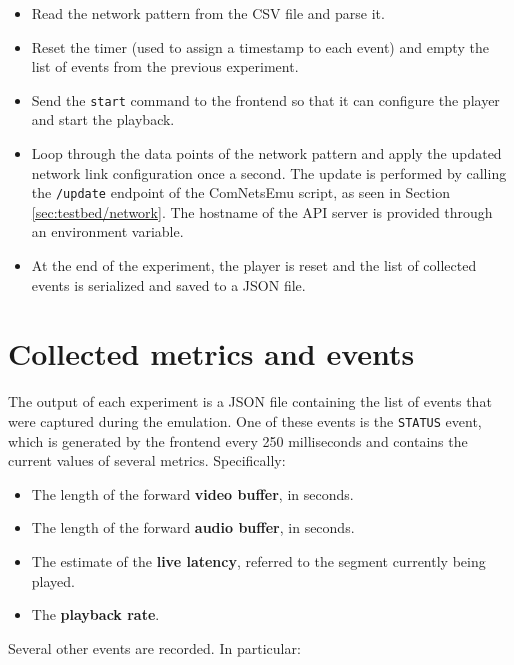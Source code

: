 \begin{itemize}
    \item Read the network pattern from the CSV file and parse it.
    \item Reset the timer (used to assign a timestamp to each event) and empty the list of events from the previous experiment.
    \item Send the \texttt{start} command to the frontend so that it can configure the player and start the playback.
    \item Loop through the data points of the network pattern and apply the updated network link configuration once a second. The update is performed by calling the \texttt{/update} endpoint of the ComNetsEmu script, as seen in Section \ref{sec:testbed/network}. The hostname of the API server is provided through an environment variable.
    \item At the end of the experiment, the player is reset and the list of collected events is serialized and saved to a JSON file.
\end{itemize}

\section{Collected metrics and events}
\label{sec:testbed/metrics}

The output of each experiment is a JSON file containing the list of events that were captured during the emulation. One of these events is the \texttt{STATUS} event, which is generated by the frontend every 250 milliseconds and contains the current values of several metrics. Specifically:

\begin{itemize}
    \item The length of the forward \textbf{video buffer}, in seconds.
    \item The length of the forward \textbf{audio buffer}, in seconds.
    \item The estimate of the \textbf{live latency}, referred to the segment currently being played.
    \item The \textbf{playback rate}.
\end{itemize}

Several other events are recorded. In particular:


